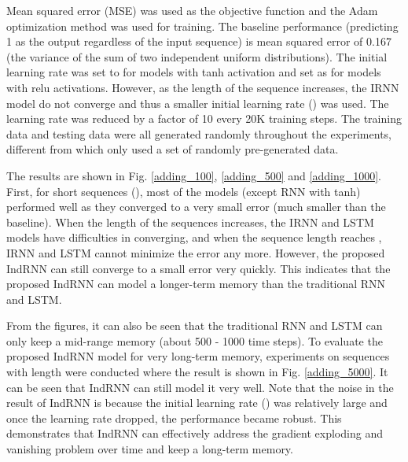 \documentclass[10pt,twocolumn,letterpaper]{article}
\begin{document}
Mean squared error (MSE) was used as the objective function and the Adam optimization method \cite{kingma2014adam} was used for training. The baseline performance (predicting 1 as the output regardless of the input sequence) is mean squared error of 0.167 (the variance of the sum of two independent uniform distributions). The initial learning rate was set to  for models with tanh activation and set as  for models with relu activations. However, as the length of the sequence increases, the IRNN model do not converge and thus a smaller initial learning rate () was used. The learning rate was reduced by a factor of 10 every 20K training steps. The training data and testing data were all generated randomly throughout the experiments, different from \cite{arjovsky2015unitary} which only used a set of randomly pre-generated data. 

The results are shown in Fig. \ref{adding_100}, \ref{adding_500} and \ref{adding_1000}. First, for short sequences (), most of the models (except RNN with tanh) performed well as they converged to a very small error (much smaller than the baseline). When the length of the sequences increases, the IRNN and LSTM models have difficulties in converging, and when the sequence length reaches , IRNN and LSTM cannot minimize the error any more. However, the proposed IndRNN can still converge to a small error very quickly. This indicates that the proposed IndRNN can model a longer-term memory than the traditional RNN and LSTM. 

From the figures, it can also be seen that the traditional RNN and LSTM can only keep a mid-range memory (about 500 - 1000 time steps). To evaluate the proposed IndRNN model for very long-term memory, experiments on sequences with length  were conducted where the result is shown in Fig. \ref{adding_5000}. It can be seen that IndRNN can still model it very well. Note that the noise in the result of IndRNN is because the initial learning rate () was relatively large and once the learning rate dropped, the performance became robust. This demonstrates that IndRNN can effectively address the gradient exploding and vanishing problem over time and keep a long-term memory. 
\end{document}
